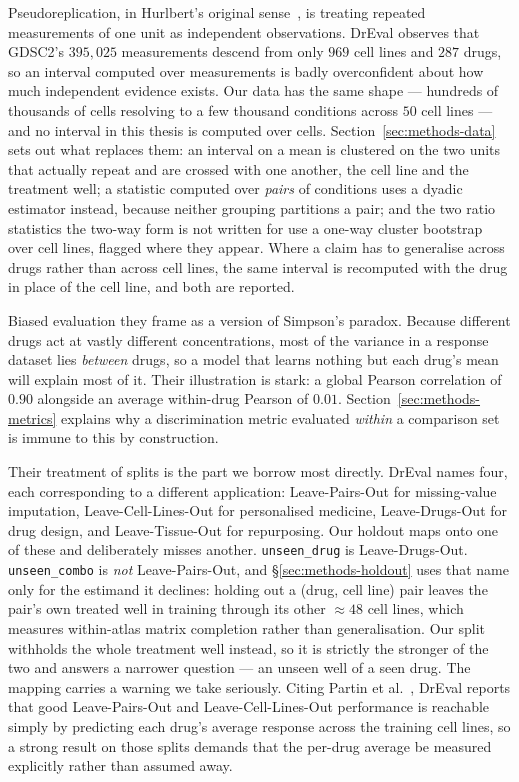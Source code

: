 Pseudoreplication, in Hurlbert's original sense~\cite{hurlbert}, is treating repeated measurements of
one unit as independent observations. DrEval observes that GDSC2's $395{,}025$ measurements descend
from only $969$ cell lines and $287$ drugs, so an interval computed over measurements is badly
overconfident about how much independent evidence exists. Our data has the same shape --- hundreds of
thousands of cells resolving to a few thousand conditions across $50$ cell lines --- and no interval
in this thesis is computed over cells. Section~\ref{sec:methods-data} sets out what replaces them:
an interval on a mean is clustered on the two units that actually repeat and are crossed with one
another, the cell line and the treatment well; a statistic computed over \emph{pairs} of conditions
uses a dyadic estimator instead, because neither grouping partitions a pair; and the two ratio
statistics the two-way form is not written for use a one-way cluster bootstrap over cell lines,
flagged where they appear. Where a claim has to generalise across drugs rather than across cell
lines, the same interval is recomputed with the drug in place of the cell line, and both are
reported.

Biased evaluation they frame as a version of Simpson's paradox. Because different drugs act at
vastly different concentrations, most of the variance in a response dataset lies \emph{between}
drugs, so a model that learns nothing but each drug's mean will explain most of it. Their
illustration is stark: a global Pearson correlation of $0.90$ alongside an average within-drug
Pearson of $0.01$. Section~\ref{sec:methods-metrics} explains why a discrimination metric evaluated
\emph{within} a comparison set is immune to this by construction.

Their treatment of splits is the part we borrow most directly. DrEval names four, each corresponding
to a different application: Leave-Pairs-Out for missing-value imputation, Leave-Cell-Lines-Out for
personalised medicine, Leave-Drugs-Out for drug design, and Leave-Tissue-Out for repurposing. Our
holdout maps onto one of these and deliberately misses another. \texttt{unseen\_drug} is
Leave-Drugs-Out. \texttt{unseen\_combo} is \emph{not} Leave-Pairs-Out, and
\S\ref{sec:methods-holdout} uses that name only for the estimand it declines: holding out a
(drug, cell line) pair leaves the pair's own treated well in training through its other
$\approx 48$ cell lines, which measures within-atlas matrix completion rather than generalisation.
Our split withholds the whole treatment well instead, so it is strictly the stronger of the two and
answers a narrower question --- an unseen well of a seen drug. The mapping carries a
warning we take seriously. Citing Partin et al.~\cite{partin}, DrEval reports that good
Leave-Pairs-Out and Leave-Cell-Lines-Out performance is reachable simply by predicting each drug's
average response across the training cell lines, so a strong result on those splits demands that the
per-drug average be measured explicitly rather than assumed away.

